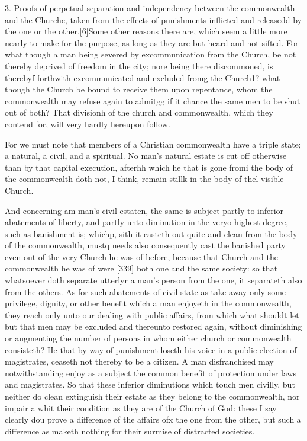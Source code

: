3. Proofs of perpetual separation and independency between the commonwealth and the Churchc, taken from the effects of punishments inflicted and releasedd by the one or the other.[6]Some other reasons there are, which seem a little more nearly to make for the purpose, as long as they are but heard and not sifted. For what though a man being severed by excommunication from the Church, be not thereby deprived of freedom in the city; nore being there discommoned, is therebyf forthwith excommunicated and excluded fromg the Church1? what though the Church be bound to receive them upon repentance, whom the commonwealth may refuse again to admitgg if it chance the same men to be shut out of both? That divisionh of the church and commonwealth, which they contend for, will very hardly hereupon follow.

For we must note that members of a Christian commonwealth have a triple state; a natural, a civil, and a spiritual. No man’s natural estate is cut off otherwise than by that capital execution, afterhh which he that is gone fromi the body of the commonwealth doth not, I think, remain stillk in the body of thel visible Church.

And concerning am man’s civil estaten, the same is subject partly to inferior abatements of liberty, and partly unto diminution in the veryo highest degree, such as banishment is; whichp, sith it casteth out quite and clean from the body of the commonwealth, mustq needs also consequently cast the banished party even out of the very Church he was of before, because that Church and the commonwealth he was of were [339] both one and the same society: so that whatsoever doth separate utterlyr a man’s person from the one, it separateth also from the others. As for such abatements of civil state as take away only some privilege, dignity, or other benefit which a man enjoyeth in the commonwealth, they reach only unto our dealing with public affairs, from which what shouldt let but that men may be excluded and thereunto restored again, without diminishing or augmenting the number of persons in whom either church or commonwealth consisteth? He that by way of punishment loseth his voice in a public election of magistrates, ceaseth not thereby to be a citizen. A man disfranchised may notwithstanding enjoy as a subject the common benefit of protection under laws and magistrates. So that these inferior diminutions which touch men civilly, but neither do clean extinguish their estate as they belong to the commonwealth, nor impair a whit their condition as they are of the Church of God: these I say clearly dou prove a difference of the affairs ofx the one from the other, but such a difference as maketh nothing for their surmise of distracted societies.


